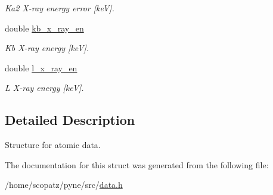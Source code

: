 \begin{DoxyCompactItemize}
\begin{DoxyCompactList}\small\item\em Ka2 X-\/ray energy error \mbox{[}ke\-V\mbox{]}. \end{DoxyCompactList}\item 
\hypertarget{structpyne_1_1atomic_aa93013778d65dc071c27564449e351de}{double \hyperlink{structpyne_1_1atomic_aa93013778d65dc071c27564449e351de}{kb\-\_\-x\-\_\-ray\-\_\-en}}\label{structpyne_1_1atomic_aa93013778d65dc071c27564449e351de}

\begin{DoxyCompactList}\small\item\em Kb X-\/ray energy \mbox{[}ke\-V\mbox{]}. \end{DoxyCompactList}\item 
\hypertarget{structpyne_1_1atomic_a43e9e36e9b5bd8e4e77ffbe86b5ef28d}{double \hyperlink{structpyne_1_1atomic_a43e9e36e9b5bd8e4e77ffbe86b5ef28d}{l\-\_\-x\-\_\-ray\-\_\-en}}\label{structpyne_1_1atomic_a43e9e36e9b5bd8e4e77ffbe86b5ef28d}

\begin{DoxyCompactList}\small\item\em L X-\/ray energy \mbox{[}ke\-V\mbox{]}. \end{DoxyCompactList}\end{DoxyCompactItemize}


\subsection{Detailed Description}
Structure for atomic data. 

The documentation for this struct was generated from the following file\-:\begin{DoxyCompactItemize}
\item 
/home/scopatz/pyne/src/\hyperlink{data_8h}{data.\-h}\end{DoxyCompactItemize}
